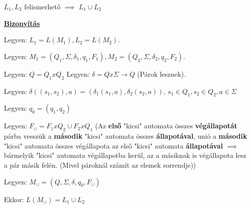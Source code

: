 \documentclass[10pt]{article}
\renewcommand{\\}{\par\noindent}
\begin{document}
\begin{frame}
\begin{tcolorbox}[title={Tétel: Felismerhető nyelvek egyesítése}]
$L_1, L_2$ felismerhető $\implies$ $L_1 \cup L_2$\\
\tcblower
\smallskip
\underline{\textbf{Bizonyítás}}\\
\medskip
\\
Legyen: $L_1 = L(M_1), L_2 = L(M_2)$.\\
Legyen: $M_1 = (Q_1, \Sigma , {\delta}_1, q_1, F_1), M_2 = (Q_2, \Sigma , {\delta}_2, q_2, F_2)$.\\
Legyen: $Q = Q_1 x Q_2$
Legyen: $\delta = Q x \Sigma \rightarrow Q$ (Párok lesznek).\\
Legyen: $\delta((s_1, s_2), a) = ({\delta}_1(s_1, a), {\delta}_2(s_2, a))$, $s_1 \in Q_1, s_2 \in Q_2, a \in \Sigma$\\
\bigskip
Legyen: $q_0 = (q_1, q_2)$\\
Legyen: \underline{\textbf{$F_{\cup} = F_1 x Q_2 \cup F_2 x Q_1$}} (Az \textbf{első} "kicsi" automata összes \textbf{végállapotát} párba vesszük a \textbf{második} "kicsi" automata összes \textbf{állapotával}, unió a \textbf{második} "kicsi" automata összes végállapota az első "kicsi" automata \textbf{állapotával} $\implies$ bármelyik "kicsi" automata végállapotba kerül, az a másiknak is végállapota lesz a pár másik felén. (Mivel pároknál számít az elemek sorrendje))\\
\smallskip
Legyen: $M_{\cup} = (Q, \Sigma , \delta , q_0, F_{\cup})$\\
\bigskip
Ekkor: \underline{$L(M_{\cup}) = L_1 \cup L_2$}\\
\end{tcolorbox}

\end{frame}
\end{document}
